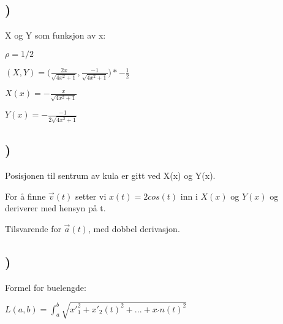 \documentclass[a4paper,10pt,norsk]{article}
\begin{document}
\subsection{)}
X og Y som funksjon av x:

$\rho = 1/2$

$(X, Y) = \Big( \frac{2x}{\sqrt{4x^{2} + 1}}, \frac{-1}{\sqrt{4x^{2} + 1}} \Big) * -\frac{1}{2}$

$X(x) = -\frac{x}{\sqrt{4x^{2} + 1}}$

$Y(x) = -\frac{-1}{2\sqrt{4x^{2} + 1}} $

\subsection{)}
Posisjonen til sentrum av kula er gitt ved X(x) og Y(x).

For å finne $\vec{v}(t)$ setter vi $x(t) = 2cos(t)$ inn i $X(x)$ og $Y(x)$ og deriverer med hensyn på t.

Tilsvarende for $\vec{a}(t)$, med dobbel derivasjon.

\subsection{)}

Formel for buelengde:

$L(a, b) = \int_{a}^{b} \sqrt{x'_{1}^{2} + x'_{2}(t)^{2} + ... + x_'{n}(t)^{2}}$
\end{document}
